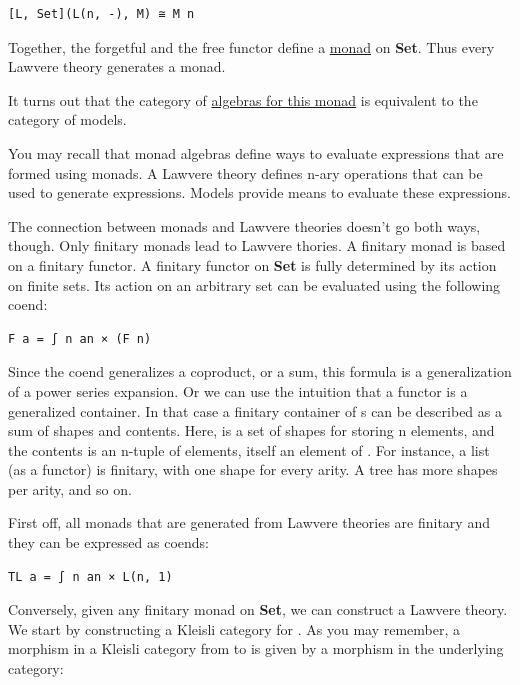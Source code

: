 \begin{verbatim}
[L, Set](L(n, -), M) ≅ M n
\end{verbatim}

Together, the forgetful and the free functor define a
\href{https://bartoszmilewski.com/2016/12/27/monads-categorically/}{monad}
 on \textbf{Set}. Thus every Lawvere theory generates
a monad.

It turns out that the category of
\href{https://bartoszmilewski.com/2017/03/14/algebras-for-monads/}{algebras
for this monad} is equivalent to the category of models.

You may recall that monad algebras define ways to evaluate expressions
that are formed using monads. A Lawvere theory defines n-ary operations
that can be used to generate expressions. Models provide means to
evaluate these expressions.

The connection between monads and Lawvere theories doesn't go both ways,
though. Only finitary monads lead to Lawvere thories. A finitary monad
is based on a finitary functor. A finitary functor on \textbf{Set} is
fully determined by its action on finite sets. Its action on an
arbitrary set  can be evaluated using the following coend:

\begin{verbatim}
F a = ∫ n an × (F n)
\end{verbatim}

Since the coend generalizes a coproduct, or a sum, this formula is a
generalization of a power series expansion. Or we can use the intuition
that a functor is a generalized container. In that case a finitary
container of s can be described as a sum of shapes and
contents. Here,  is a set of shapes for storing n elements,
and the contents is an n-tuple of elements, itself an element of
. For instance, a list (as a functor) is finitary, with one
shape for every arity. A tree has more shapes per arity, and so on.

First off, all monads that are generated from Lawvere theories are
finitary and they can be expressed as coends:

\begin{verbatim}
TL a = ∫ n an × L(n, 1)
\end{verbatim}

Conversely, given any finitary monad  on \textbf{Set}, we can
construct a Lawvere theory. We start by constructing a Kleisli category
for . As you may remember, a morphism in a Kleisli category
from  to  is given by a morphism in the underlying
category:

